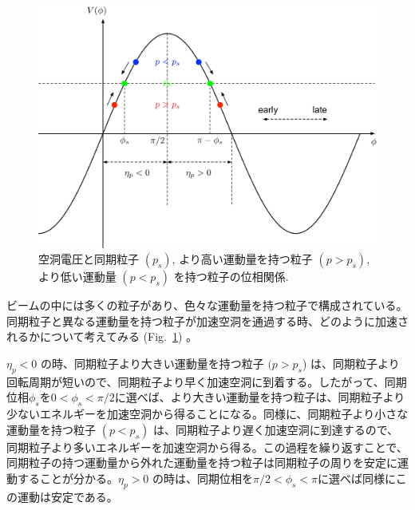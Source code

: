 \documentclass[10pt,a4paper]{jlreq}
\begin{document}
\begin{figure}[hbt]
  \begin{center}
    \includegraphics[width=15cm,clip]{figs/phase_stability.pdf}
    \caption{空洞電圧と同期粒子 $(p_s)$, より高い運動量を持つ粒子 $(p>p_s)$, より低い運動量 $(p<p_s)$ を持つ粒子の位相関係.}
    \label{phase_stability}
  \end{center}
\end{figure}

ビームの中には多くの粒子があり、色々な運動量を持つ粒子で構成されている。同期粒子と異なる運動量を持つ粒子が加速空洞を通過する時、どのように加速されるかについて考えてみる (Fig.~\ref{phase_stability}) 。

$\eta_p < 0$ の時、同期粒子より大きい運動量を持つ粒子 $(p>p_s$) は、同期粒子より回転周期が短いので、同期粒子より早く加速空洞に到着する。したがって、同期位相$\phi_s$を$0<\phi_s<\pi/2$に選べば、より大きい運動量を持つ粒子は、同期粒子より少ないエネルギーを加速空洞から得ることになる。同様に、同期粒子より小さな運動量を持つ粒子 $(p<p_s)$ は、同期粒子より遅く加速空洞に到達するので、同期粒子より多いエネルギーを加速空洞から得る。この過程を繰り返すことで、同期粒子の持つ運動量から外れた運動量を持つ粒子は同期粒子の周りを安定に運動することが分かる。$\eta_p > 0$ の時は、同期位相を$\pi/2<\phi_s<\pi$に選べば同様にこの運動は安定である。
\end{document}
